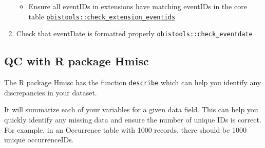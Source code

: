 \documentclass[
  letterpaper,
  DIV=11,
  numbers=noendperiod,
  oneside]{scrreprt}
\providecommand{\tightlist}{%
  \setlength{\itemsep}{0pt}\setlength{\parskip}{0pt}}\usepackage{longtable,booktabs,array}
\begin{document}
\begin{enumerate}
  \begin{itemize}
  \tightlist
  \item
    Ensure all eventIDs in extensions have matching eventIDs in the core
    table
    \href{https://github.com/iobis/obistools\#check-eventid-in-an-extension}{\texttt{obistools::check\_extension\_eventids}}
  \end{itemize}
\item
  Check that eventDate is formatted properly
  \href{https://github.com/iobis/obistools\#check-eventdate}{\texttt{obistools::check\_eventdate}}
\end{enumerate}

\hypertarget{qc-with-r-package-hmisc}{%
\subsection{QC with R package Hmisc}\label{qc-with-r-package-hmisc}}

The R package
\href{https://cran.r-project.org/web/packages/Hmisc/index.html}{Hmisc}
has the function
\href{https://rdrr.io/cran/Hmisc/man/describe.html}{\texttt{describe}}
which can help you identify any discrepancies in your dataset.

It will summarize each of your variables for a given data field. This
can help you quickly identify any missing data and ensure the number of
unique IDs is correct. For example, in an Occurrence table with 1000
records, there should be 1000 unique occurrenceIDs.
\end{document}
